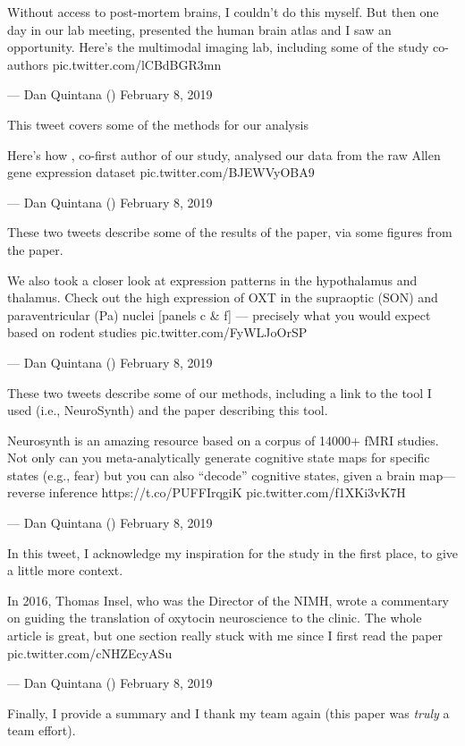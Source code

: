 \documentclass[]{book}
\begin{document}
Without access to post-mortem brains, I couldn't do this myself. But then one day in our lab meeting, \citet{jarekrokicki} presented the \citet{AllenInstitute} human brain atlas and I saw an opportunity. Here's the \citet{SFFNORMENT} multimodal imaging lab, including some of the study co-authors pic.twitter.com/lCBdBGR3mn

--- Dan Quintana (\citet{dsquintana}) February 8, 2019

This tweet covers some of the methods for our analysis

Here's how \citet{jarekrokicki}, co-first author of our study, analysed our data from the raw Allen gene expression dataset pic.twitter.com/BJEWVyOBA9

--- Dan Quintana (\citet{dsquintana}) February 8, 2019

These two tweets describe some of the results of the paper, via some figures from the paper.

We also took a closer look at expression patterns in the hypothalamus and thalamus. Check out the high expression of OXT in the supraoptic (SON) and paraventricular (Pa) nuclei {[}panels c \& f{]} --- precisely what you would expect based on rodent studies pic.twitter.com/FyWLJoOrSP

--- Dan Quintana (\citet{dsquintana}) February 8, 2019

These two tweets describe some of our methods, including a link to the tool I used (i.e., NeuroSynth) and the paper describing this tool.

Neurosynth is an amazing resource based on a corpus of 14000+ fMRI studies. Not only can you meta-analytically generate cognitive state maps for specific states (e.g., fear) but you can also ``decode'' cognitive states, given a brain map---reverse inference https://t.co/PUFFIrqgiK pic.twitter.com/f1XKi3vK7H

--- Dan Quintana (\citet{dsquintana}) February 8, 2019

In this tweet, I acknowledge my inspiration for the study in the first place, to give a little more context.

In 2016, Thomas Insel, who was the Director of the NIMH, wrote a commentary on guiding the translation of oxytocin neuroscience to the clinic. The whole article is great, but one section really stuck with me since I first read the paper pic.twitter.com/cNHZEcyASu

--- Dan Quintana (\citet{dsquintana}) February 8, 2019

Finally, I provide a summary and I thank my team again (this paper was \emph{truly} a team effort).
\end{document}
